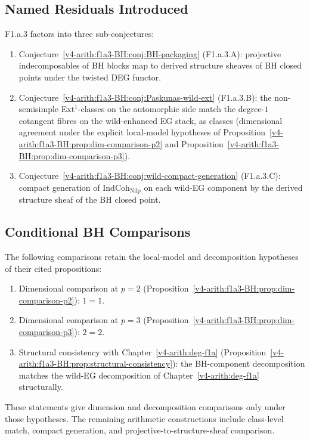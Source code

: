 \subsection{Named Residuals Introduced}

F1.a.3 factors into three sub-conjectures:

\begin{enumerate}
\item Conjecture~\ref{v4-arith:f1a3-BH:conj:BH-packaging} (F1.a.3.A): projective
indecomposables of BH blocks map to derived structure sheaves of BH
closed points under the twisted DEG functor.
\item Conjecture~\ref{v4-arith:f1a3-BH:conj:Paskunas-wild-ext} (F1.a.3.B): the
non-semisimple Ext\({}^{1}\)-classes on the automorphic side match the
degree-\(1\) cotangent fibres on the wild-enhanced EG stack, as classes
(dimensional agreement under the explicit local-model hypotheses of
Proposition~\ref{v4-arith:f1a3-BH:prop:dim-comparison-p2} and
Proposition~\ref{v4-arith:f1a3-BH:prop:dim-comparison-p3}).
\item Conjecture~\ref{v4-arith:f1a3-BH:conj:wild-compact-generation} (F1.a.3.C):
compact generation of \(\mathrm{IndCoh}_{\mathrm{Nilp}}\) on each wild-EG
component by the derived structure sheaf of the BH closed point.
\end{enumerate}

\subsection{Conditional BH Comparisons}

The following comparisons retain the local-model and decomposition
hypotheses of their cited propositions:

\begin{enumerate}
\item Dimensional comparison at \(p=2\)
(Proposition~\ref{v4-arith:f1a3-BH:prop:dim-comparison-p2}): \(1=1\).
\item Dimensional comparison at \(p=3\)
(Proposition~\ref{v4-arith:f1a3-BH:prop:dim-comparison-p3}): \(2=2\).
\item Structural consistency with Chapter~\ref{v4-arith:deg-f1a}
(Proposition~\ref{v4-arith:f1a3-BH:prop:structural-consistency}): the
BH-component decomposition matches the wild-EG
decomposition of Chapter~\ref{v4-arith:deg-f1a} structurally.
\end{enumerate}

These statements give dimension and decomposition comparisons only
under those hypotheses. The remaining arithmetic constructions include
class-level match, compact generation, and projective-to-structure-sheaf
comparison.

